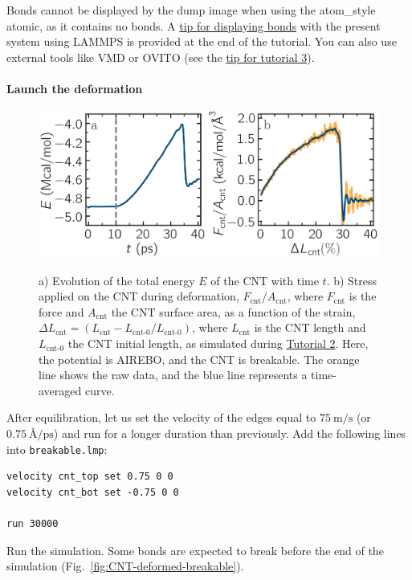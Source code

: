 \documentclass[9pt,tutorial]{livecoms}
\newcommand{\lmpcmdnote}[1]{\colorbox{note_listing}{\textcolor{command}{\small{#1}}}} %
\newcommand{\flecmd}[1]{\textcolor{command}{\texttt{#1}}} %
\begin{document}
\begin{note}
  Bonds cannot be displayed by the \lmpcmdnote{dump image} when using
  the \lmpcmdnote{atom\_style atomic}, as it contains no bonds.  A
  \hyperref[tip-dynamic-bonds]{tip for displaying bonds} with the
  present system using LAMMPS is provided at the end of the tutorial.
  You can also use external tools like VMD or OVITO (see the
  \hyperref[tip-external-viz]{tip for tutorial 3}).
\end{note}

\paragraph{Launch the deformation}

\begin{figure}
\centering
\includegraphics[width=\linewidth]{CNT-breakable-stress-energy}\\[-2ex]
\caption{a) Evolution of the total energy $E$ of the CNT with time $t$.
b) Stress applied on the CNT during deformation, $F_\text{cnt}/A_\text{cnt}$,
where $F_\text{cnt}$ is the force and $A_\text{cnt}$ the CNT surface area,
as a function of the strain, $\Delta L_\text{cnt} = (L_\text{cnt}-L_\text{cnt-0}/L_\text{cnt-0})$, where
$L_\text{cnt}$ is the CNT length and $L_\text{cnt-0}$ the CNT initial length,
as simulated during \hyperref[carbon-nanotube-label]{Tutorial 2}.
Here, the potential is AIREBO, and the CNT is breakable.  The orange line
shows the raw data, and the blue line represents a time-averaged curve.}
\label{fig:CNT-breakable-energy-stress}
\end{figure}

After equilibration, let us set the velocity of the edges equal to
$75~\text{m/s}$ (or $0.75~\text{\AA{}/ps}$) and run for a longer duration than
previously.  Add the following lines into \flecmd{breakable.lmp}:
\begin{lstlisting}
velocity cnt_top set 0.75 0 0
velocity cnt_bot set -0.75 0 0

run 30000
\end{lstlisting}
Run the simulation.  Some bonds are expected to break before the end of the
simulation (Fig.~\ref{fig:CNT-deformed-breakable}).
\end{document}
